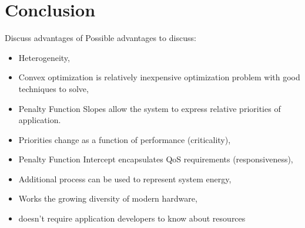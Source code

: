 \section{Conclusion}
Discuss advantages of \pacora
Possible advantages to discuss:
\begin{itemize}
\item Heterogeneity,
\item Convex optimization is relatively inexpensive optimization problem with good techniques to solve,
\item Penalty Function Slopes allow the system to express relative priorities of application.
\item Priorities change as a function of performance (criticality),
\item Penalty Function Intercept encapsulates QoS requirements (responsiveness),
\item Additional process can be used to represent system energy,
\item Works the growing diversity of modern hardware,
\item doesn't require application developers to know about resources
\end{itemize}
